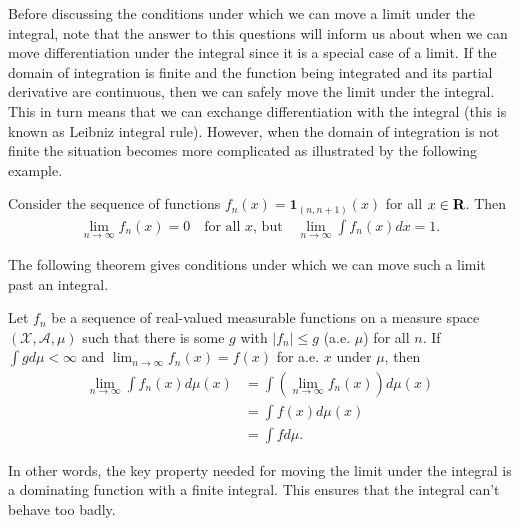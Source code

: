 \documentclass[twoside]{article}
\begin{document}
Before discussing the conditions under which we can move a limit under the
integral, note that the answer to this questions will inform us about when we
can move differentiation under the integral since it is a special case of a
limit.  If the domain of integration is finite and the function being
integrated and its partial derivative are continuous, then we can safely move
the limit under the integral.  This in turn means that we can exchange
differentiation with the integral (this is known as Leibniz integral rule).
However, when the domain of integration is not finite the situation becomes
more complicated as illustrated by the following example.

\begin{example}
Consider the sequence of functions $f_n(x) = \mathbf{1}_{(n, n+1)}(x)$ for all
$x \in \mathbf{R}$.  Then
\begin{align*}
  \lim_{n \rightarrow \infty} f_n(x) = 0 \quad \text{for all $x$, but} \quad
  \lim_{n \rightarrow \infty} \int f_n(x) dx = 1.
\end{align*}
\end{example}

The following theorem gives conditions under which we can move such a limit
past an integral.

\begin{theorem}\citep[Theorem 2.5, p.~29]{keener}
  Let ${f_n}$ be a sequence of real-valued measurable functions on a
  measure space $(\mathcal X, \mathcal A, \mu)$ such that there is some
  $g$ with $|f_n| \le g$ (a.e. $\mu$) for all $n$.  If $\int g d\mu < \infty$
  and $\lim_{n \rightarrow \infty} f_n(x) = f(x)$ for a.e. $x$ under $\mu$,
  then
  \begin{align*}
    \lim_{n \rightarrow \infty} \int f_n(x) d\mu(x) &= \int
      \left(\lim_{n \rightarrow \infty} f_n(x) \right) d\mu(x) \\
       &= \int f(x) d\mu(x) \\
       &= \int f d\mu.
  \end{align*} 
\end{theorem}

In other words, the key property needed for moving the limit under the integral
is a dominating function with a finite integral.  This ensures that the
integral can't behave too badly.
\end{document}
